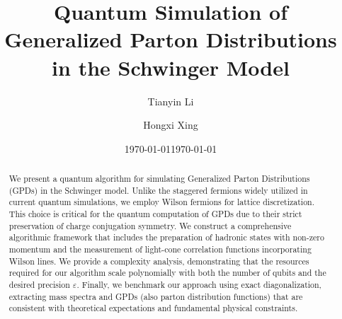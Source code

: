 \documentclass[aps,prd,twocolumn,superscriptaddress,notitlepage,nofootinbib,preprintnumbers]{revtex4-1}
\begin{document}
\title{Quantum Simulation of Generalized Parton Distributions in the Schwinger Model}

\date{\today}

\author{Tianyin Li}

\author{Hongxi Xing}


\date{\today}         

\begin{abstract}
We present a quantum algorithm for simulating Generalized Parton Distributions (GPDs) in the Schwinger model. Unlike the staggered fermions widely utilized in current quantum simulations, we employ Wilson fermions for lattice discretization. This choice is critical for the quantum computation of GPDs due to their strict preservation of charge conjugation symmetry. We construct a comprehensive algorithmic framework that includes the preparation of hadronic states with non-zero momentum and the measurement of light-cone correlation functions incorporating Wilson lines. We provide a complexity analysis, demonstrating that the resources required for our algorithm scale polynomially with both the number of qubits and the desired precision $\varepsilon$. Finally, we benchmark our approach using exact diagonalization, extracting mass spectra and GPDs (also parton distribution functions) that are consistent with theoretical expectations and fundamental physical constraints.

\end{abstract}

\maketitle
\end{document}
